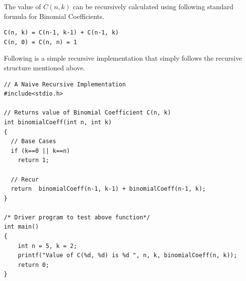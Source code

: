 \RayNotesEnd

\textbf{}


The value of $C(n,k)$ can be recursively calculated using following standard
formula for Binomial Coefficients.
\begin{lstlisting}[style=raygeneric]
C(n, k) = C(n-1, k-1) + C(n-1, k)
C(n, 0) = C(n, n) = 1
\end{lstlisting}
Following is a simple recursive implementation that simply follows the
recursive structure mentioned above.
\begin{lstlisting}[style=raycppnewsnippet]
// A Naive Recursive Implementation
#include<stdio.h>
 
// Returns value of Binomial Coefficient C(n, k)
int binomialCoeff(int n, int k)
{
  // Base Cases
  if (k==0 || k==n)
    return 1;
 
  // Recur
  return  binomialCoeff(n-1, k-1) + binomialCoeff(n-1, k);
}
 
/* Driver program to test above function*/
int main()
{
    int n = 5, k = 2;
    printf("Value of C(%d, %d) is %d ", n, k, binomialCoeff(n, k));
    return 0;
}
\end{lstlisting}


